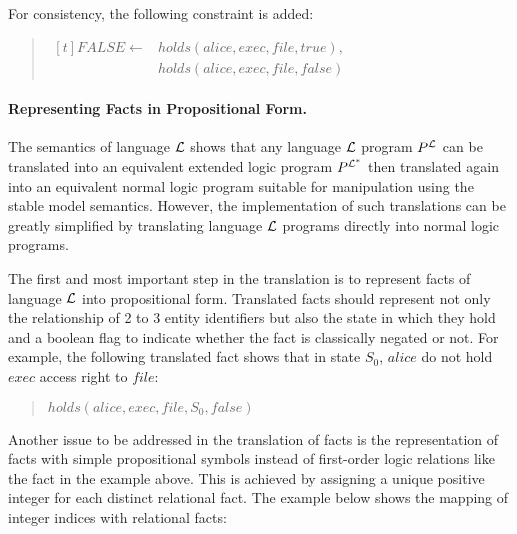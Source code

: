 \documentclass[10pt, twocolumn]{article}
\begin{document}
          For consistency, the following constraint is added:

          \begin{quote}
            \begin{math}
              \begin{aligned}[t]
                FALSE \leftarrow & holds(alice, exec, file, true), \\
                & holds(alice, exec, file, false)
              \end{aligned}
            \end{math}
          \end{quote}

        \paragraph{Representing Facts in Propositional Form.}

          The semantics of language ${\cal L}$ shows that any language
          ${\cal L}$ program $P^{\cal L}$ can be translated into an equivalent
          extended logic program $P^{\cal{L^{*}}}$ then translated again into
          an equivalent normal logic program suitable for manipulation using
          the stable model semantics. However, the implementation of such
          translations can be greatly simplified by translating language
          ${\cal L}$ programs directly into normal logic programs.

          The first and most important step in the translation is to represent
          facts of language ${\cal L}$ into propositional form. Translated
          facts should represent not only the relationship of 2 to 3 entity
          identifiers but also the state in which they hold and a boolean flag
          to indicate whether the fact is classically negated or not. For
          example, the following translated fact shows that in state $S_{0}$,
          $alice$ do not hold $exec$ access right to $file$:

          \begin{quote}
            $holds(alice, exec, file, S_{0}, false)$
          \end{quote}

          Another issue to be addressed in the translation of facts is the
          representation of facts with simple propositional symbols instead
          of first-order logic relations like the fact in the example above.
          This is achieved by assigning a unique positive integer for each
          distinct relational fact. The example below shows the mapping of
          integer indices with relational facts:
\end{document}
